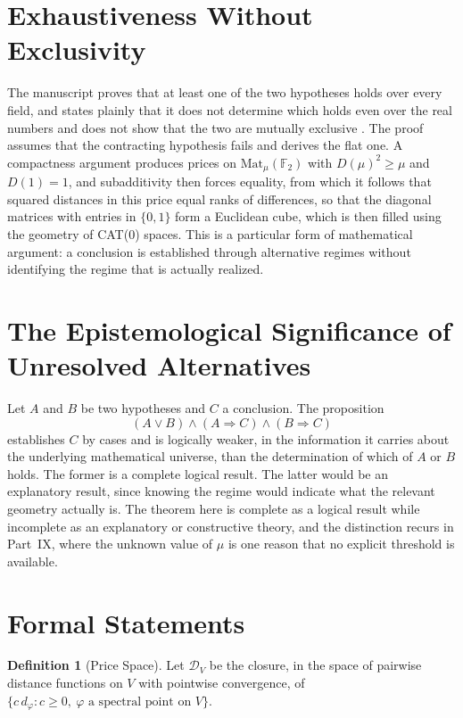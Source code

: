 \documentclass[11pt,letterpaper]{report}
\theoremstyle{plain}
\theoremstyle{definition}
\newtheorem{definition}[theorem]{Definition}
\theoremstyle{remark}
\begin{document}
\section{Exhaustiveness Without Exclusivity}

The manuscript proves that at least one of the two hypotheses holds over every field, and states plainly that it does not determine which holds even over the real numbers and does not show that the two are mutually exclusive \cite{Source2026}. The proof assumes that the contracting hypothesis fails and derives the flat one. A compactness argument produces prices on $\mathrm{Mat}_\mu(\mathbb F_2)$ with $D(\mu)^2\ge\mu$ and $D(1)=1$, and subadditivity then forces equality, from which it follows that squared distances in this price equal ranks of differences, so that the diagonal matrices with entries in $\{0,1\}$ form a Euclidean cube, which is then filled using the geometry of CAT(0) spaces. This is a particular form of mathematical argument: a conclusion is established through alternative regimes without identifying the regime that is actually realized.

\section{The Epistemological Significance of Unresolved Alternatives}

Let $A$ and $B$ be two hypotheses and $C$ a conclusion. The proposition
\[
(A\lor B)\land(A\Rightarrow C)\land(B\Rightarrow C)
\]
establishes $C$ by cases and is logically weaker, in the information it carries about the underlying mathematical universe, than the determination of which of $A$ or $B$ holds. The former is a complete logical result. The latter would be an explanatory result, since knowing the regime would indicate what the relevant geometry actually is. The theorem here is complete as a logical result while incomplete as an explanatory or constructive theory, and the distinction recurs in Part~IX, where the unknown value of $\mu$ is one reason that no explicit threshold is available.

\section{Formal Statements}

\begin{definition}[Price Space]
Let $\mathcal D_V$ be the closure, in the space of pairwise distance functions on $V$ with pointwise convergence, of $\{c\,d_\varphi:c\ge0,\ \varphi\text{ a spectral point on }V\}$.
\end{definition}
\end{document}
